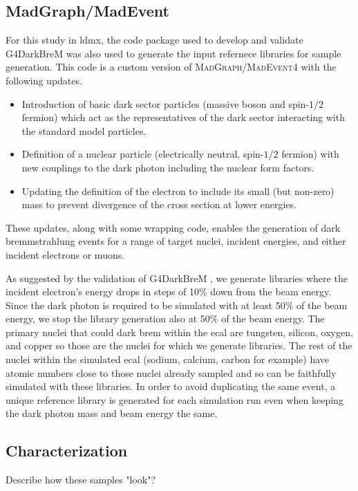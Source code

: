 \subsection{MadGraph/MadEvent}
For this study in \ac{ldmx}, the code package used to develop and validate G4DarkBreM was also used
to generate the input refernece libraries for sample generation. This code is a custom version of
\textsc{MadGraph/MadEvent4} with the following updates.
\begin{itemize}
  \item Introduction of basic dark sector particles (massive boson and spin-$1/2$ fermion) which act as the
        representatives of the dark sector interacting with the standard model particles.
  \item Definition of a nuclear particle (electrically neutral, spin-$1/2$ fermion) with new couplings to
        the dark photon including the nuclear form factors.
  \item Updating the definition of the electron to include its small (but non-zero) mass to prevent
        divergence of the cross section at lower energies.
\end{itemize}
These updates, along with some wrapping code, enables the generation of
dark bremmstrahlung events for a range of target nuclei, incident energies,
and either incident electrons or muons.

As suggested by the validation of G4DarkBreM \cite{g4darkbrem}, we generate libraries where the
incident electron's energy drops in steps of 10\% down from the beam energy. Since the dark photon
is required to be simulated with at least 50\% of the beam energy, we stop the library generation
also at 50\% of the beam energy. The primary nuclei that could dark brem within the \ac{ecal} are
tungsten, silicon, oxygen, and copper so those are the nuclei for which we generate libraries. The
rest of the nuclei within the simulated \ac{ecal} (sodium, calcium, carbon for example) have atomic
numbers close to those nuclei already sampled and so can be faithfully simulated with these
libraries. In order to avoid duplicating the same event, a unique reference library is generated
for each simulation run even when keeping the dark photon mass and beam energy the same.

\subsection{Characterization}
Describe how these samples "look"?


